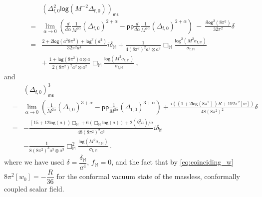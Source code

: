 \documentclass[11pt]{book}
\newcommand{\pp}{\mathsf{pp}}
\newcommand{\ms}{\mathsf{ms}}
\renewcommand{\log}{\mathsf{log}}
\newcommand{\Mbb}{\mathbb{M}}
\newcommand{\fsf}{\mathsf{f}}
\theoremstyle{break}
\begin{document}
%
\begin{eqnarray*}
&& \left(\Delta^2_{\fsf,0} \log\left(M^{-2} \Delta_{\fsf,0}\right)\right)_\ms \\
&=& \lim_{\alpha\to 0}\left(\frac{d}{d\alpha}\frac{1}{M^{2\alpha}}(\Delta_{\fsf,0})^{2+\alpha}-\pp\frac{d}{d\alpha}\frac{1}{M^{2\alpha}}(\Delta_{\fsf,0})^{2+\alpha}\right) \ - \ \frac{i\log^2(8\pi^2)}{32\pi^2}\delta \\
%
&=& \frac{2+2\log (a^2 8\pi^2)+\log^2 (a^2)}{32\pi^2 a^4}i\delta_\mathbb{M}+\frac{1}{4(8\pi^2)^2 a^2\otimes a^2}\Box_{\mathbb{M}}\frac{\log^2\left(M^2\sigma_{\fsf,\mathbb{M}}\right)}{\sigma_{\fsf,\mathbb{M}}}\\
%
&& + \ \frac{1+\log(8\pi^2) a\otimes a}{2(8\pi^2)^2 a^2\otimes a^2}\Box_{\mathbb{M}}\frac{\log\left(M^2\sigma_{\fsf,\mathbb{M}}\right)}{\sigma_{\fsf,\mathbb{M}}} \ ,
\end{eqnarray*}
%
and
%
\begin{eqnarray*}
&& (\Delta_{\fsf,0})^3_\ms \\ 
&=& \lim_{\alpha\to 0}\left(\frac{1}{M^{2\alpha}}(\Delta_{\fsf,0})^{3+\alpha}-\pp\frac{1}{M^{2\alpha}}(\Delta_{\fsf,0})^{3+\alpha}\right)+\frac{i\left((1+2\log(8\pi^2))R+192\pi^2[w]\right)}{48(8\pi^2)^2}\delta\\
%
&=&-\frac{(15+12\log (a))\Box_\mathbb{M}+6(\Box_\mathbb{M} \log (a))+2(\partial^2_\tau a)/a}{48(8\pi^2)^2a^6}i\delta_\mathbb{M} \\ 
&& - \frac{1}{8(8\pi^2)^3 a^3\otimes a^3}\Box^2_{\mathbb{M}}\frac{\log\left(M^2\sigma_{\fsf,\mathbb{M}}\right)}{\sigma_{\fsf,\mathbb{M}}}\,.
\end{eqnarray*}
%
where we have used $\delta = \dfrac{\delta_{\Mbb}}{a^4}$, $f_{\Mbb}=0$, and the fact that by \eqref{eq:coinciding_w} $8\pi^2[w_0]=-\dfrac{R}{36}$ for the conformal vacuum state of the massless, conformally coupled scalar field. 
\end{document}
